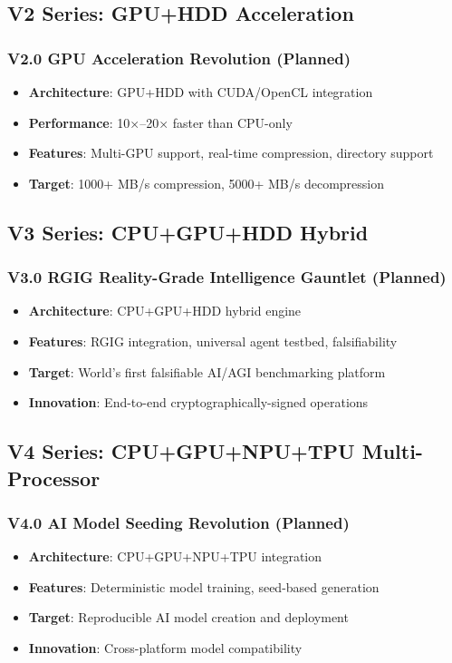 \documentclass[12pt,a4paper]{article}
\begin{document}
\subsection{V2 Series: GPU+HDD Acceleration}
\subsubsection{V2.0 GPU Acceleration Revolution (Planned)}
\begin{itemize}
    \item \textbf{Architecture}: GPU+HDD with CUDA/OpenCL integration
    \item \textbf{Performance}: 10×–20× faster than CPU-only
    \item \textbf{Features}: Multi-GPU support, real-time compression, directory support
    \item \textbf{Target}: 1000+ MB/s compression, 5000+ MB/s decompression
\end{itemize}

\subsection{V3 Series: CPU+GPU+HDD Hybrid}
\subsubsection{V3.0 RGIG Reality-Grade Intelligence Gauntlet (Planned)}
\begin{itemize}
    \item \textbf{Architecture}: CPU+GPU+HDD hybrid engine
    \item \textbf{Features}: RGIG integration, universal agent testbed, falsifiability
    \item \textbf{Target}: World's first falsifiable AI/AGI benchmarking platform
    \item \textbf{Innovation}: End-to-end cryptographically-signed operations
\end{itemize}

\subsection{V4 Series: CPU+GPU+NPU+TPU Multi-Processor}
\subsubsection{V4.0 AI Model Seeding Revolution (Planned)}
\begin{itemize}
    \item \textbf{Architecture}: CPU+GPU+NPU+TPU integration
    \item \textbf{Features}: Deterministic model training, seed-based generation
    \item \textbf{Target}: Reproducible AI model creation and deployment
    \item \textbf{Innovation}: Cross-platform model compatibility
\end{itemize}
\end{document}
